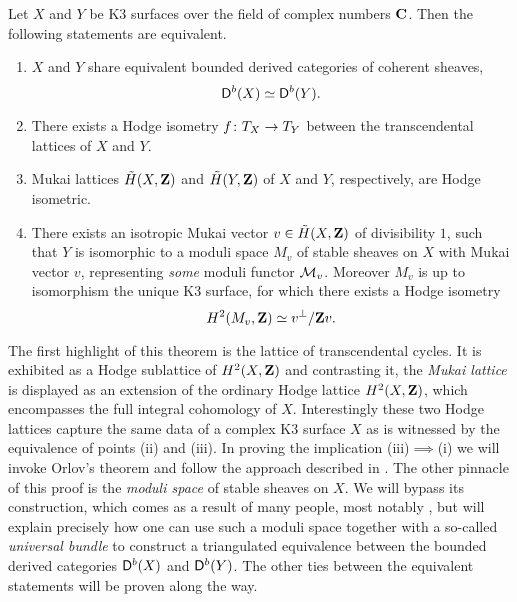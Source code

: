 \begin{theorem*}
    Let $X$ and $Y$ be K3 surfaces over the field of complex numbers $\mathbf C$. Then the following statements are equivalent.
    \begin{enumerate}[label = (\roman*)]
        \item{$X$ and $Y$ share equivalent bounded derived categories of coherent sheaves, 
        \[
            \mathsf{D}^b(X) \simeq \mathsf{D}^b(Y).
        \]
        }
        \item{There exists a Hodge isometry $f \colon T_{X} \to T_{Y}$ between the transcendental lattices of $X$ and $Y$.}
        \item{Mukai lattices $\,\tilde{\!{H}}(X, \mathbf Z)$ and $\,\tilde{\!{H}}(Y, \mathbf Z)$ of $X$ and $Y$, respectively, are Hodge isometric. 
        }
        \item{There exists 
        an isotropic Mukai vector $v \in \,\tilde{\!{H}}(X, \mathbf Z)$ of divisibility $1$,
        such that $Y$ is isomorphic to a moduli space $M_v$ of stable sheaves on $X$ with Mukai vector $v$, representing \emph{some} moduli functor $\mathcal M_v$. Moreover $M_v$ is up to isomorphism the unique K3 surface, for which there exists a Hodge isometry
        \[
            H^{2}(M_v, \mathbf Z) \simeq v^\perp / \mathbf Z v.
        \]
        }
    \end{enumerate}
\end{theorem*}

The first highlight of this theorem is the lattice of transcendental cycles. It is exhibited as a Hodge sublattice of $H^{2}(X, \mathbf Z)$ and contrasting it, the \emph{Mukai lattice} is displayed as an extension of the ordinary Hodge lattice $H^{2}(X, \mathbf Z)$, which encompasses the full integral cohomology of $X$. Interestingly these two Hodge lattices capture the same data of a complex K3 surface $X$ as is witnessed by the equivalence of points (ii) and (iii). In proving the implication (iii)$\implies$(i) we will invoke Orlov's theorem and follow the approach described in \cite{Orlov2003}. The other pinnacle of this proof is the \emph{moduli space} of stable sheaves on $X$. We will bypass its construction, which comes as a result of many people, most notably \cite{GottscheHuybrechts1996,OGrady1997,huybrechts2006fouriermukai}, but will explain precisely how one can use such a moduli space together with a so-called \emph{universal bundle} to construct a triangulated equivalence between the bounded derived categories $\mathsf{D}^b(X)$ and $\mathsf{D}^b(Y)$. The other ties between the equivalent statements will be proven along the way. 

